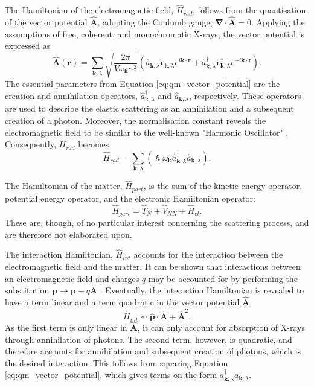 The Hamiltonian of the electromagnetic field, $\hat{H}_{rad}$, follows from the quantisation of the vector potential $\bm{\widehat{A}}$, adopting the Coulumb gauge, $\bm{\nabla} \cdot \bm{\widehat{A}} = 0$.
Applying the assumptions of free, coherent, and monochromatic X-rays, the vector potential is expressed as
\begin{equation}\label{eq:qm_vector_potential}
    \bm{\widehat{A}}(\bm{r}) = \sum_{\bm{k}, \lambda} \sqrt{\frac{2 \pi}{V \omega_{\bm{k}} \alpha^{2}  }} \left( \hat{a}_{\bm{k},\lambda} \bm{\epsilon}_{\bm{k},\lambda} e^{i \bm{k}\cdot\bm{r}} + \hat{a}_{\bm{k},\lambda}^{\dagger} \bm{\epsilon}_{\bm{k},\lambda}^{*} e^{-i \bm{k}\cdot\bm{r}}  \right).
\end{equation}
The essential parameters from Equation \eqref{eq:qm_vector_potential} are the creation and annihilation operators, $\hat{a}_{\bm{k},\lambda}^{\dagger}$ and $\hat{a}_{\bm{k},\lambda}$, respectively.
These operators are used to describe the elastic scattering as an annihilation and a subsequent creation of a photon.
Moreover, the normalisation constant reveals the electromagnetic field to be similar to the well-known "Harmonic Oscillator" \cite{mcmorrow2011elements}. Consequently, $H_{rad}$ becomes
\begin{equation}
    \hat{H}_{rad} = \sum_{\bm{k}, \lambda} \left( \hslash \omega_{\bm{k}} \hat{a}_{\bm{k},\lambda}^{\dagger} \hat{a}_{\bm{k},\lambda}  \right).
\end{equation}

The Hamiltonian of the matter, $\hat{H}_{part}$, is the sum of the kinetic energy operator, potential energy operator, and the electronic Hamiltonian operator:
\begin{equation}\label{eq:qm_Hamiltonian_matter}
    \hat{H}_{part} = \hat{T}_{N} + \hat{V}_{NN} + \hat{H}_{el}.
\end{equation}
These are, though, of no particular interest concerning the scattering process, and are therefore not elaborated upon.

The interaction Hamiltonian, $\hat{H}_{int}$ accounts for the interaction between the electromagnetic field and the matter.
It can be shown that interactions between an electromagnetic field and charges $q$ may be accounted for by performing the substitution
$\bm{p} \rightarrow \bm{p}-q\bm{A}$ \cite{mcmorrow2011elements}. Eventually, the interaction Hamiltonian is revealed to have a term linear and a term quadratic in the vector potential $\bm{\widehat{A}}$:
\begin{equation}\label{eq:qm_interaction_Hamiltonian}
    \hat{H}_{int} \sim \bm{\widehat{p}} \cdot \bm{\widehat{A}} + \bm{\widehat{A}}^{2}.
\end{equation}
As the first term is only linear in $\bm{\widehat{A}}$, it can only account for absorption of X-rays through annihilation of photons.
The second term, however, is quadratic, and therefore accounts for annihilation and subsequent creation of photons, which is the desired interaction.
This follows from squaring Equation \eqref{eq:qm_vector_potential}, which gives terms on the form $a_{\bm{k},\lambda}^{\dagger} a_{\bm{k},\lambda}$.

